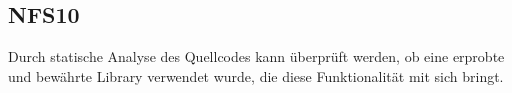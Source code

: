 \subsection*{NFS10}
Durch \gls{statische Analyse} des \Gls{Quellcode}s kann überprüft werden, ob eine erprobte und bewährte \Gls{Library} verwendet wurde,
die diese Funktionalität mit sich bringt.